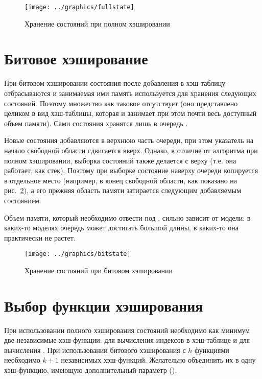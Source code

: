 \begin{figure}[ht]
  \centering
  \texttt{[image: ../graphics/fullstate]}
  \caption{Хранение состояний при полном хэшировании}
  \label{fig:fullstate}
\end{figure}

\section{Битовое хэширование}
\label{sec:bithash-store}

При битовом хэшировании состояния после добавления в хэш-таблицу отбрасываются и
занимаемая ими память используется для хранения следующих состояний. Поэтому множество
 как таковое отсутствует (оно представлено целиком в вид хэш-таблицы,
которая и занимает при этом почти весь доступный объем памяти). Сами состояния хранятся
лишь в очередь .

Новые состояния добавляются в верхнюю часть очереди, при этом указатель на начало
свободной области сдвигается вверх. Однако, в отличие от алгоритма при полном хэшировании,
выборка состояний также делается с верху  (т.е. она работает, как
стек). Поэтому при выборке состояние наверху очереди копируется в отдельное место
(например, в конец свободной области, как показано на рис.~\ref{fig:bitstate}), а его
прежняя область памяти затирается следующим добавляемым состоянием.

Объем памяти, который необходимо отвести под , сильно зависит от модели: в
каких-то моделях очередь может достигать большой длины, в каких-то она практически не
растет.

\begin{figure}[ht]
  \centering
  \texttt{[image: ../graphics/bitstate]}  
  \caption{Хранение состояний при битовом хэшировании}
  \label{fig:bitstate}
\end{figure}

\section{Выбор функции хэширования}
\label{sec:hashing-function}

При использовании полного хэширования состояний необходимо как минимум две независимые
хэш-функции: для вычисления индексов в хэш-таблице и для вычисления . При
использовании битового хэширования с $h$ функциями необходимо $k + 1$ независимых
хэш-функций. Желательно объединить их в одну хэш-функцию, имеющую дополнительный параметр
().

